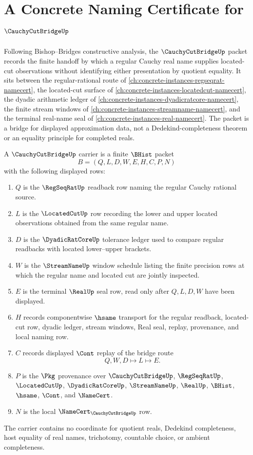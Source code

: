 \chapter{A Concrete Naming Certificate for $\CauchyCutBridgeUp$}
\label{ch:concrete-instances-cauchy-cut-bridge-namecert}

Following Bishop--Bridges constructive analysis, the $\CauchyCutBridgeUp$ packet records the finite handoff by which a regular Cauchy real name supplies located-cut observations without identifying either presentation by quotient equality. It sits between the regular-rational route of \autoref{ch:concrete-instances-regseqrat-namecert}, the located-cut surface of \autoref{ch:concrete-instances-locatedcut-namecert}, the dyadic arithmetic ledger of \autoref{ch:concrete-instances-dyadicratcore-namecert}, the finite stream windows of \autoref{ch:concrete-instances-streamname-namecert}, and the terminal real-name seal of \autoref{ch:concrete-instances-real-namecert}. The packet is a bridge for displayed approximation data, not a Dedekind-completeness theorem or an equality principle for completed reals.

\begin{definition}
\label{def:cauchy-cut-bridge-carrier}
A $\CauchyCutBridgeUp$ carrier is a finite $\BHist$ packet
$$
B=(Q,L,D,W,E,H,C,P,N)
$$
with the following displayed rows:
\begin{enumerate}
\item $Q$ is the $\RegSeqRatUp$ readback row naming the regular Cauchy rational source.
\item $L$ is the $\LocatedCutUp$ row recording the lower and upper located observations obtained from the same regular name.
\item $D$ is the $\DyadicRatCoreUp$ tolerance ledger used to compare regular readbacks with located lower--upper brackets.
\item $W$ is the $\StreamNameUp$ window schedule listing the finite precision rows at which the regular name and located cut are jointly inspected.
\item $E$ is the terminal $\RealUp$ seal row, read only after $Q,L,D,W$ have been displayed.
\item $H$ records componentwise $\hsame$ transport for the regular readback, located-cut row, dyadic ledger, stream windows, Real seal, replay, provenance, and local naming row.
\item $C$ records displayed $\Cont$ replay of the bridge route
$$
Q,W,D \longmapsto L \longmapsto E .
$$
\item $P$ is the $\Pkg$ provenance over $\CauchyCutBridgeUp$, $\RegSeqRatUp$, $\LocatedCutUp$, $\DyadicRatCoreUp$, $\StreamNameUp$, $\RealUp$, $\BHist$, $\hsame$, $\Cont$, and $\NameCert$.
\item $N$ is the local $\NameCert_{\CauchyCutBridgeUp}$ row.
\end{enumerate}
The carrier contains no coordinate for quotient reals, Dedekind completeness, host equality of real names, trichotomy, countable choice, or ambient completeness.
\end{definition}

